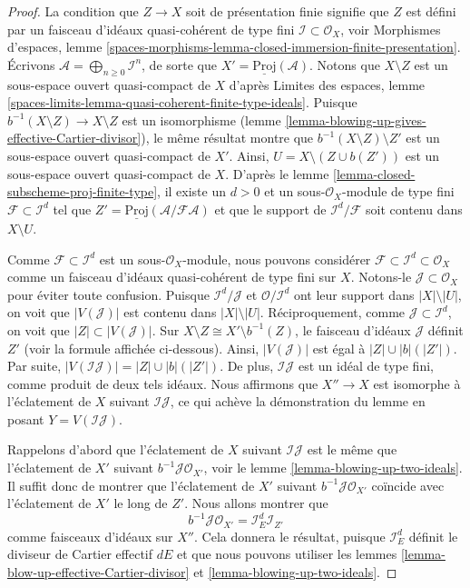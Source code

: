 \begin{proof}
La condition que $Z \to X$ soit de présentation finie signifie que
$Z$ est défini par un faisceau d'idéaux quasi-cohérent de type fini
$\mathcal{I} \subset \mathcal{O}_X$, voir
Morphismes d'espaces, lemme
\ref{spaces-morphisms-lemma-closed-immersion-finite-presentation}.
Écrivons $\mathcal{A} = \bigoplus_{n \geq 0} \mathcal{I}^n$, de sorte que
$X' = \underline{\text{Proj}}(\mathcal{A})$.
Notons que $X \setminus Z$ est un sous-espace ouvert quasi-compact de $X$ d'après
Limites des espaces, lemme
\ref{spaces-limits-lemma-quasi-coherent-finite-type-ideals}.
Puisque $b^{-1}(X \setminus Z) \to X \setminus Z$ est un isomorphisme
(lemme \ref{lemma-blowing-up-gives-effective-Cartier-divisor}), le même
résultat montre que
$b^{-1}(X \setminus Z) \setminus Z'$ est un sous-espace ouvert quasi-compact de $X'$.
Ainsi, $U = X \setminus (Z \cup b(Z'))$ est un sous-espace ouvert quasi-compact de $X$.
D'après le lemme \ref{lemma-closed-subscheme-proj-finite-type},
il existe un $d > 0$ et un
sous-$\mathcal{O}_X$-module de type fini $\mathcal{F} \subset \mathcal{I}^d$ tel
que $Z' = \underline{\text{Proj}}(\mathcal{A}/\mathcal{F}\mathcal{A})$
et que le support de $\mathcal{I}^d/\mathcal{F}$ soit contenu
dans $X \setminus U$.

\medskip\noindent
Comme $\mathcal{F} \subset \mathcal{I}^d$ est un sous-$\mathcal{O}_X$-module,
nous pouvons considérer $\mathcal{F} \subset \mathcal{I}^d \subset \mathcal{O}_X$
comme un faisceau d'idéaux quasi-cohérent de type fini sur $X$. Notons-le
$\mathcal{J} \subset \mathcal{O}_X$ pour éviter toute confusion. Puisque
$\mathcal{I}^d / \mathcal{J}$ et $\mathcal{O}/\mathcal{I}^d$ ont
leur support dans $|X| \setminus |U|$, on voit que $|V(\mathcal{J})|$ est contenu
dans $|X| \setminus |U|$. Réciproquement, comme $\mathcal{J} \subset \mathcal{I}^d$,
on voit que $|Z| \subset |V(\mathcal{J})|$. Sur
$X \setminus Z \cong X' \setminus b^{-1}(Z)$, le faisceau d'idéaux
$\mathcal{J}$ définit $Z'$ (voir la formule affichée ci-dessous). Ainsi,
$|V(\mathcal{J})|$ est égal à $|Z| \cup |b|(|Z'|)$. Par suite,
$|V(\mathcal{I}\mathcal{J})| = |Z| \cup |b|(|Z'|)$. De plus,
$\mathcal{I}\mathcal{J}$ est un idéal de type fini, comme produit de deux tels idéaux.
Nous affirmons que $X'' \to X$ est isomorphe à l'éclatement de $X$ suivant
$\mathcal{I}\mathcal{J}$, ce qui achève la démonstration du lemme en posant
$Y = V(\mathcal{I}\mathcal{J})$.

\medskip\noindent
Rappelons d'abord que l'éclatement de $X$ suivant $\mathcal{I}\mathcal{J}$
est le même que l'éclatement de $X'$ suivant $b^{-1}\mathcal{J} \mathcal{O}_{X'}$,
voir le lemme \ref{lemma-blowing-up-two-ideals}.
Il suffit donc de montrer que l'éclatement de $X'$ suivant
$b^{-1}\mathcal{J} \mathcal{O}_{X'}$ coïncide avec l'éclatement de $X'$
le long de $Z'$. Nous allons montrer que
$$
b^{-1}\mathcal{J} \mathcal{O}_{X'} = \mathcal{I}_E^d \mathcal{I}_{Z'}
$$
comme faisceaux d'idéaux sur $X''$. Cela donnera le résultat, puisque
$\mathcal{I}_E^d$ définit le diviseur de Cartier effectif $dE$
et que nous pouvons utiliser les lemmes \ref{lemma-blow-up-effective-Cartier-divisor} et
\ref{lemma-blowing-up-two-ideals}.


\end{proof}
